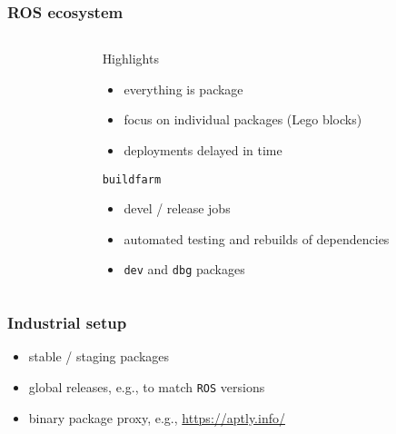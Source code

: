 \documentclass[hyperref={colorlinks=false, breaklinks=true},11pt]{beamer}
\begin{document}
\begin{frame}
    \frametitle{ROS ecosystem}


    \begin{columns}[T]
    \begin{column}{.49\textwidth}
    \end{column}
    \begin{column}{.49\textwidth}
        \begin{block}{Highlights}
            \begin{itemize}
                \item everything is package
                \item focus on individual packages (Lego blocks)
                \item deployments delayed in time
            \end{itemize}
        \end{block}
        \begin{block}{\texttt{buildfarm}}
            \begin{itemize}
                \item devel / release jobs
                \item automated testing and rebuilds of dependencies
                \item \texttt{dev} and \texttt{dbg} packages
            \end{itemize}
        \end{block}
    \end{column}
    \end{columns}
\end{frame}

\begin{frame}
    \frametitle{Industrial setup}


    \begin{block}{}
        \begin{itemize}
            \item stable / staging packages
            \item global releases, e.g., to match \texttt{ROS} versions
            \item binary package proxy, e.g., \url{https://aptly.info/}
        \end{itemize}
    \end{block}
\end{frame}
\end{document}
